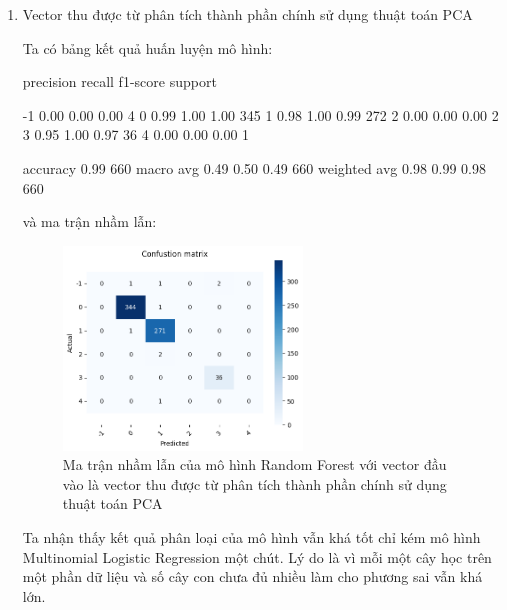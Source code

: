 \begin{enumerate}[label=(\alph*)]
    \item Vector thu được từ phân tích thành phần chính sử dụng thuật toán PCA 
    
    Ta có bảng kết quả huấn luyện mô hình:

    \begin{python}
        precision    recall  f1-score   support

          -1       0.00      0.00      0.00         4
           0       0.99      1.00      1.00       345
           1       0.98      1.00      0.99       272
           2       0.00      0.00      0.00         2
           3       0.95      1.00      0.97        36
           4       0.00      0.00      0.00         1

    accuracy                           0.99       660
   macro avg       0.49      0.50      0.49       660
weighted avg       0.98      0.99      0.98       660

    \end{python}

    và ma trận nhầm lẫn:

    \begin{figure}[H]
        \centering
        \includegraphics[width=0.6\textwidth]{figures/Thanh/Data_Analysis/Non_null_confusion_matrix_Random_Forest_PCA_features.png}
        \caption{Ma trận nhầm lẫn của mô hình Random Forest với vector đầu vào là vector thu được từ phân tích thành phần chính sử dụng thuật toán PCA}
        \label{fig:Non_null_confusion_matrix_Random_Forest_PCA_features}
    \end{figure}

    Ta nhận thấy kết quả phân loại của mô hình vẫn khá tốt chỉ kém mô hình Multinomial Logistic Regression một chút.
    Lý do là vì mỗi một cây học trên một phần dữ liệu và số cây con chưa đủ nhiều làm cho phương sai vẫn khá lớn.


\end{enumerate}
